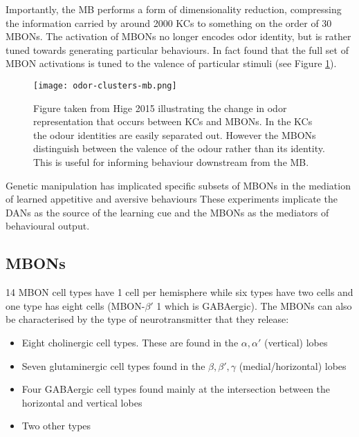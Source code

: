 \documentclass[11pt, A4]{article}
\begin{document}
\begin{multicols}{2}
Importantly, the MB performs a form of dimensionality reduction, compressing the information carried by around 2000 KCs to something on the order of 30 MBONs. The activation of MBONs no longer encodes odor identity, but is rather tuned towards generating particular behaviours. In fact \cite{hige2015} found that the full set of MBON activations is tuned to the valence of particular stimuli (see Figure \ref{fig:odor-clusters-mb}). 

\begin{figure}[H]
	\centering
	\texttt{[image: odor-clusters-mb.png]}
	\caption{Figure taken from Hige 2015 illustrating the change in odor representation that occurs between KCs and MBONs. In the KCs the odour identities are easily separated out. However the MBONs distinguish between the valence of the odour rather than its identity. This is useful for informing behaviour downstream from the MB.}
	\label{fig:odor-clusters-mb}
\end{figure}


Genetic manipulation has implicated specific subsets of MBONs in the mediation of learned appetitive and aversive behaviours 
 These experiments implicate the DANs as the source of the learning cue and the MBONs as the mediators of behavioural output.


\subsection{MBONs}

14 MBON cell types have 1 cell per hemisphere while six types have two cells and one type has eight cells (MBON-$\beta'$ 1 which is GABAergic). The MBONs can also be characterised by the type of neurotransmitter that they release:

\begin{itemize}
\itemsep0em
\item Eight cholinergic cell types. These are found in the $\alpha, \alpha '$ (vertical) lobes
%
\item Seven glutaminergic cell types found in  the $\beta, \beta', \gamma$ (medial/horizontal) lobes
%
\item Four GABAergic cell types found mainly at the intersection between the horizontal and vertical lobes
\item Two other types
\end{itemize}



\end{multicols}
\end{document}
